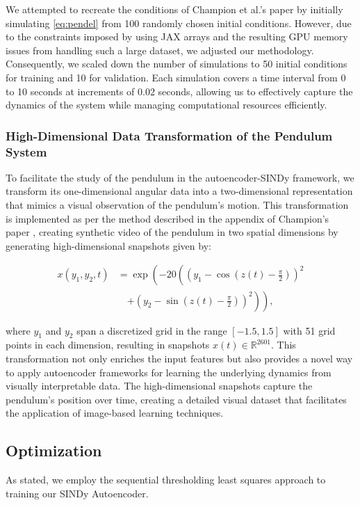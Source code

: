 We attempted to recreate the conditions of Champion et al.'s paper by initially simulating \autoref{eq:pendel} from 100 randomly chosen initial conditions. However, due to the constraints imposed by using JAX arrays and the resulting GPU memory issues from handling such a large dataset, we adjusted our methodology. Consequently, we scaled down the number of simulations to 50 initial conditions for training and 10 for validation. Each simulation covers a time interval from 0 to 10 seconds at increments of 0.02 seconds, allowing us to effectively capture the dynamics of the system while managing computational resources efficiently.

\subsubsection{High-Dimensional Data Transformation of the Pendulum System}
To facilitate the study of the pendulum in the autoencoder-SINDy framework, we transform its one-dimensional angular data into a two-dimensional representation that mimics a visual observation of the pendulum's motion. This transformation is implemented as per the method described in the appendix of Champion's paper \cite{Champion_2019}, creating synthetic video of the pendulum in two spatial dimensions by generating high-dimensional snapshots given by:

\begin{equation}
\begin{split}
    x(y_1, y_2, t) &= \exp\left(-20\left((y_1 - \cos(z(t) - \frac{\pi}{2}))^2 \right. \right. \\
    &\quad \left. \left. + (y_2 - \sin(z(t) - \frac{\pi}{2}))^2\right)\right),
\end{split}
\end{equation}

where \(y_1\) and \(y_2\) span a discretized grid in the range \([-1.5, 1.5]\) with 51 grid points in each dimension, resulting in snapshots \(x(t) \in \mathbb{R}^{2601}\). This transformation not only enriches the input features but also provides a novel way to apply autoencoder frameworks for learning the underlying dynamics from visually interpretable data. The high-dimensional snapshots capture the pendulum's position over time, creating a detailed visual dataset that facilitates the application of image-based learning techniques.

\subsection{Optimization}
As stated, we employ the sequential thresholding least squares \cite{Brunton_2016} approach to training our SINDy Autoencoder.  

